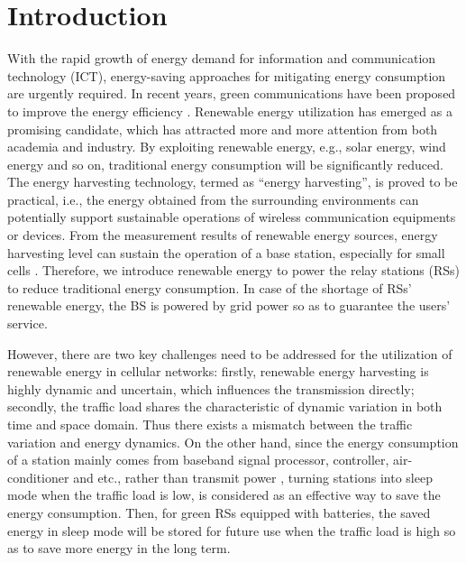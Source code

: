 \documentclass[conference]{IEEEtran}
\begin{document}
\section{Introduction}
 With the rapid growth of energy demand for information and communication technology (ICT), energy-saving approaches for mitigating energy consumption are urgently required. In recent years, green communications have been proposed to improve the energy efficiency \cite{Raffaele2011Thepotential}. Renewable energy utilization has emerged as a promising candidate, which has attracted more and more attention from both academia and industry. By exploiting renewable energy, e.g., solar energy, wind energy and so on, traditional energy consumption will be significantly reduced. The energy harvesting technology, termed as ``energy harvesting'', is proved to be practical, i.e., the energy obtained from the surrounding environments can potentially support sustainable operations of wireless communication equipments or devices. From the measurement results of renewable energy sources, energy harvesting level can sustain the operation of a base station, especially for small cells  \cite{Giuseppe2013Hetnets}. Therefore, we introduce renewable energy to power the relay stations (RSs) to reduce traditional energy consumption. In case of the shortage of RSs' renewable energy, the BS is powered by grid power so as to guarantee the users' service.

 However, there are two key challenges need to be addressed for the utilization of renewable energy in cellular networks: firstly, renewable energy harvesting is highly dynamic and uncertain, which influences the transmission directly; secondly, the traffic load shares the characteristic of dynamic variation in both time and space domain. Thus there exists a mismatch between the traffic variation and energy dynamics. On the other hand, since the energy consumption of a station mainly comes from baseband signal processor, controller, air-conditioner and etc., rather than transmit power \cite{Holger2003Anoverview}, turning stations into sleep mode when the traffic load is low, is considered as an effective way to save the energy consumption. Then, for green RSs equipped with batteries, the saved energy in sleep mode will be stored for future use when the traffic load is high so as to save more energy in the long term.
\end{document}
